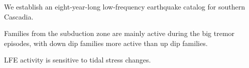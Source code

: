 \documentclass[draft]{agujournal2019}
\begin{document}



\begin{keypoints}
\item We establish an eight-year-long low-frequency earthquake catalog for southern Cascadia.
\item Families from the subduction zone are mainly active during the big tremor episodes, with down dip families more active than up dip families.
\item LFE activity is sensitive to tidal stress changes.
\end{keypoints}

%
%

\end{document}
